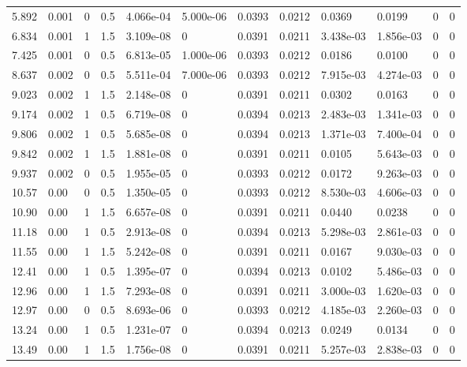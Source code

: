 \documentclass[preview]{standalone}
\begin{document}
{{\begin{tabular}{L{1.2cm}C{1.2cm} C{0.3cm}C{0.5cm} C{1.4cm}C{1.4cm} C{1.4cm}C{1.4cm} C{1.6cm}C{1.6cm} C{1.6cm}C{1.6cm}}
  5.892  &  0.001  & 0     & 0.5 &  4.066e-04  & 5.000e-06  &  0.0393&   0.0212& 0.0369 & 0.0199   &  0 & 0  \\ 
  6.834  &  0.001  & 1     & 1.5 &  3.109e-08  & 0  &  0.0391&   0.0211& 3.438e-03 & 1.856e-03   &  0 & 0  \\ 
  7.425  &  0.001  & 0     & 0.5 &  6.813e-05  & 1.000e-06  &  0.0393&   0.0212& 0.0186 & 0.0100   &  0 & 0  \\ 
  8.637  &  0.002  & 0     & 0.5 &  5.511e-04  & 7.000e-06  &  0.0393&   0.0212& 7.915e-03 & 4.274e-03   &  0 & 0  \\ 
  9.023  &  0.002  & 1     & 1.5 &  2.148e-08  & 0  &  0.0391&   0.0211& 0.0302 & 0.0163   &  0 & 0  \\ 
  9.174  &  0.002  & 1     & 0.5 &  6.719e-08  & 0  &  0.0394&   0.0213& 2.483e-03 & 1.341e-03   &  0 & 0  \\ 
  9.806  &  0.002  & 1     & 0.5 &  5.685e-08  & 0  &  0.0394&   0.0213& 1.371e-03 & 7.400e-04   &  0 & 0  \\ 
  9.842  &  0.002  & 1     & 1.5 &  1.881e-08  & 0  &  0.0391&   0.0211& 0.0105 & 5.643e-03   &  0 & 0  \\ 
  9.937  &  0.002  & 0     & 0.5 &  1.955e-05  & 0  &  0.0393&   0.0212& 0.0172 & 9.263e-03   &  0 & 0  \\ 
  10.57  &  0.00  & 0     & 0.5 &  1.350e-05  & 0  &  0.0393&   0.0212& 8.530e-03 & 4.606e-03   &  0 & 0  \\ 
  10.90  &  0.00  & 1     & 1.5 &  6.657e-08  & 0  &  0.0391&   0.0211& 0.0440 & 0.0238   &  0 & 0  \\ 
  11.18  &  0.00  & 1     & 0.5 &  2.913e-08  & 0  &  0.0394&   0.0213& 5.298e-03 & 2.861e-03   &  0 & 0  \\ 
  11.55  &  0.00  & 1     & 1.5 &  5.242e-08  & 0  &  0.0391&   0.0211& 0.0167 & 9.030e-03   &  0 & 0  \\ 
  12.41  &  0.00  & 1     & 0.5 &  1.395e-07  & 0  &  0.0394&   0.0213& 0.0102 & 5.486e-03   &  0 & 0  \\ 
  12.96  &  0.00  & 1     & 1.5 &  7.293e-08  & 0  &  0.0391&   0.0211& 3.000e-03 & 1.620e-03   &  0 & 0  \\ 
  12.97  &  0.00  & 0     & 0.5 &  8.693e-06  & 0  &  0.0393&   0.0212& 4.185e-03 & 2.260e-03   &  0 & 0  \\ 
  13.24  &  0.00  & 1     & 0.5 &  1.231e-07  & 0  &  0.0394&   0.0213& 0.0249 & 0.0134   &  0 & 0  \\ 
  13.49  &  0.00  & 1     & 1.5 &  1.756e-08  & 0  &  0.0391&   0.0211& 5.257e-03 & 2.838e-03   &  0 & 0  \\ 

\end{tabular}}}
\end{document}
